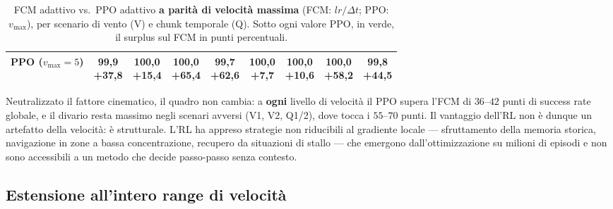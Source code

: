 \begin{table}[H]
\begin{tabular}{l c c c c c c c c}
PPO ($v_{\max}{=}5$) & \shortstack{99{,}9\\[-1pt]{\scriptsize\textcolor{green!50!black}{+37{,}8}}} & \shortstack{100{,}0\\[-1pt]{\scriptsize\textcolor{green!50!black}{+15{,}4}}} & \shortstack{100{,}0\\[-1pt]{\scriptsize\textcolor{green!50!black}{+65{,}4}}} & \shortstack{99{,}7\\[-1pt]{\scriptsize\textcolor{green!50!black}{+62{,}6}}} & \shortstack{100{,}0\\[-1pt]{\scriptsize\textcolor{green!50!black}{+7{,}7}}} & \shortstack{100{,}0\\[-1pt]{\scriptsize\textcolor{green!50!black}{+10{,}6}}} & \shortstack{100{,}0\\[-1pt]{\scriptsize\textcolor{green!50!black}{+58{,}2}}} & \shortstack{99{,}8\\[-1pt]{\scriptsize\textcolor{green!50!black}{+44{,}5}}} \\
\bottomrule
\end{tabular}
\caption{FCM adattivo vs.\ PPO adattivo \textbf{a parit\`a di velocit\`a massima} (FCM:
         $lr/\Delta t$; PPO: $v_{\max}$), per scenario di vento (V) e chunk temporale (Q).
         Sotto ogni valore PPO, in verde, il surplus sul FCM in punti percentuali.}
\label{tab:fcm_ppo_vel}
\end{table}

Neutralizzato il fattore cinematico, il quadro non cambia: a \textbf{ogni} livello di
velocit\`a il PPO supera l'FCM di $36$--$42$ punti di success rate globale, e il divario
resta massimo negli scenari avversi (V1, V2, Q1/2), dove tocca i $55$--$70$ punti. Il
vantaggio dell'RL non \`e dunque un artefatto della velocit\`a: \`e strutturale. L'RL ha
appreso strategie non riducibili al gradiente locale --- sfruttamento della memoria
storica, navigazione in zone a bassa concentrazione, recupero da situazioni di stallo ---
che emergono dall'ottimizzazione su milioni di episodi e non sono accessibili a un metodo
che decide passo-passo senza contesto.

\subsection{Estensione all'intero range di velocit\`a}
\label{sec:rl_fullrange}

